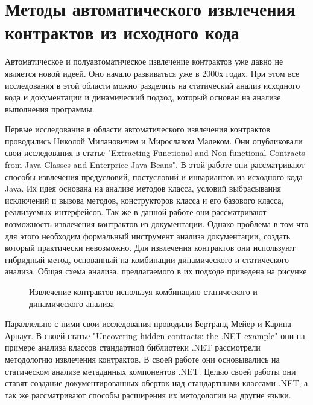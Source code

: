 \section{Методы автоматического извлечения контрактов из исходного кода}
Автоматическое и полуавтоматическое извлечение контрактов уже давно не является новой идеей. Оно начало развиваться уже в 2000х годах. При этом все исследования в этой области можно разделить на 
статический анализ исходного кода и документации и динамический подход, который основан на анализе выполнения программы.

Первые исследования в области автоматического извлечения контрактов проводились Николой Милановичем и Мирославом Малеком. Они опубликовали свои исследования в статье "Extracting Functional and Non-functional Contracts from Java Classes and Enterprice Java Beans"\cite{extractingContractsFromJava}. В этой работе они рассматривают способы извлечения предусловий, постусловий и инвариантов из исходного кода Java. Их идея основана на анализе методов класса, условий выбрасывания исключений и вызова методов, конструкторов класса и его базового класса, реализуемых интерфейсов. Так же в данной работе они рассматривают возможность извлечения контрактов из документации. Однако проблема в том что для этого необходим формальный инструмент анализа документации, создать который практически невозможно. Для извлечения контрактов они используют гибридный метод, основанный на комбинации динамического и статического анализа. Общая схема анализа, предлагаемого в их подходе приведена на рисунке
\begin{figure}[h!]
\caption{Извлечение контрактов используя комбинацию статического и динамического анализа}
\label{image:milanovicExample}
\end{figure}

Параллельно с ними свои исследования проводили Бертранд Мейер и Карина Арнаут. В своей статье "Uncovering hidden contracts: the .NET example" они на примере анализа классов стандартной библиотеки .NET рассмотрели методологию извлечения контрактов\cite{uncoveringHiddenContracts}. В своей работе они основывались на статическом анализе метаданных компонентов .NET. Целью своей работы они ставят создание документированных оберток над стандартными классами .NET, а так же рассматривают способы расширения их методологии на другие языки. 

